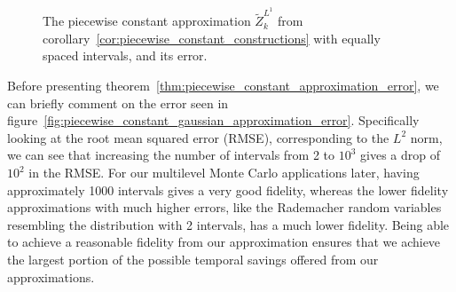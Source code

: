 \documentclass[manuscript,review]{acmart}
\begin{document}
\begin{figure}[htb]
\centering

\hfill
{} \hfill 
{}\hfill

\caption{The piecewise constant approximation $ \tilde{Z}_k^{L^1} $ from corollary~\ref{cor:piecewise_constant_constructions} with equally spaced intervals, and its error.}
\label{fig:piecewise_constant_approximation}
\end{figure}

Before presenting theorem~\ref{thm:piecewise_constant_approximation_error}, we can briefly comment on the error seen in figure~\ref{fig:piecewise_constant_gaussian_approximation_error}. Specifically looking at the root mean squared error (RMSE), corresponding to the $ L^2 $ norm, we can see that increasing the number of intervals from 2 to $ 10^3 $ gives a drop of $ 10^2 $ in the RMSE. For our multilevel Monte Carlo applications later, having approximately 1000 intervals gives a very good fidelity, whereas the lower fidelity approximations with much higher errors, like the Rademacher random variables resembling the distribution with 2 intervals, has a much lower fidelity. Being able to achieve a reasonable fidelity from our approximation ensures that we achieve the largest portion of the possible temporal savings offered from our approximations. 
\end{document}
